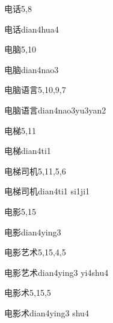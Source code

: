 \begin{entry}{电话}{5,8}
  \begin{phonetics}{电话}{dian4hua4}
  \end{phonetics}
\end{entry}

\begin{entry}{电脑}{5,10}
  \begin{phonetics}{电脑}{dian4nao3}
  \end{phonetics}
\end{entry}

\begin{entry}{电脑语言}{5,10,9,7}
  \begin{phonetics}{电脑语言}{dian4nao3yu3yan2}
  \end{phonetics}
\end{entry}

\begin{entry}{电梯}{5,11}
  \begin{phonetics}{电梯}{dian4ti1}
  \end{phonetics}
\end{entry}

\begin{entry}{电梯司机}{5,11,5,6}
  \begin{phonetics}{电梯司机}{dian4ti1 si1ji1}
  \end{phonetics}
\end{entry}

\begin{entry}{电影}{5,15}
  \begin{phonetics}{电影}{dian4ying3}
  \end{phonetics}
\end{entry}

\begin{entry}{电影艺术}{5,15,4,5}
  \begin{phonetics}{电影艺术}{dian4ying3 yi4shu4}
  \end{phonetics}
\end{entry}

\begin{entry}{电影术}{5,15,5}
  \begin{phonetics}{电影术}{dian4ying3 shu4}
  \end{phonetics}
\end{entry}

